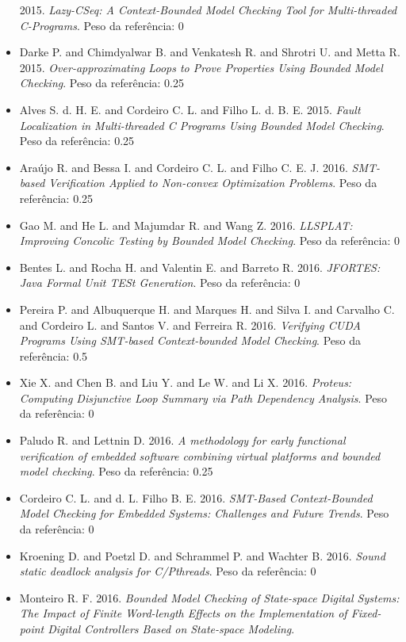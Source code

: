 \begin{itemize}
      2015.
      {\it Lazy-CSeq: A Context-Bounded Model Checking Tool for Multi-threaded C-Programs}.
      Peso da referência: 0
\item Darke P. and Chimdyalwar B. and Venkatesh R. and Shrotri U. and Metta R.
      2015.
      {\it Over-approximating Loops to Prove Properties Using Bounded Model Checking}.
      Peso da referência: 0.25
\item Alves S. d. H. E. and Cordeiro C. L. and Filho L. d. B. E.
      2015.
      {\it Fault Localization in Multi-threaded C Programs Using Bounded Model Checking}.
      Peso da referência: 0.25
\item Araújo R. and Bessa I. and Cordeiro C. L. and Filho C. E. J.
      2016.
      {\it SMT-based Verification Applied to Non-convex Optimization Problems}.
      Peso da referência: 0.25
\item Gao M. and He L. and Majumdar R. and Wang Z.
      2016.
      {\it LLSPLAT: Improving Concolic Testing by Bounded Model Checking}.
      Peso da referência: 0
\item Bentes L. and Rocha H. and Valentin E. and Barreto R.
      2016.
      {\it JFORTES: Java Formal Unit TESt Generation}.
      Peso da referência: 0
\item Pereira P. and Albuquerque H. and Marques H. and Silva I. and Carvalho C. and Cordeiro L. and Santos V. and Ferreira R.
      2016.
      {\it Verifying CUDA Programs Using SMT-based Context-bounded Model Checking}.
      Peso da referência: 0.5
\item Xie X. and Chen B. and Liu Y. and Le W. and Li X.
      2016.
      {\it Proteus: Computing Disjunctive Loop Summary via Path Dependency Analysis}.
      Peso da referência: 0
\item Paludo R. and Lettnin D.
      2016.
      {\it A methodology for early functional verification of embedded software combining virtual platforms and bounded model checking}.
      Peso da referência: 0.25
\item Cordeiro C. L. and d. L. Filho B. E.
      2016.
      {\it SMT-Based Context-Bounded Model Checking for Embedded Systems: Challenges and Future Trends}.
      Peso da referência: 0
\item Kroening D. and Poetzl D. and Schrammel P. and Wachter B.
      2016.
      {\it Sound static deadlock analysis for C/Pthreads}.
      Peso da referência: 0
\item Monteiro R. F.
      2016.
      {\it Bounded Model Checking of State-space Digital Systems: The Impact of Finite Word-length Effects on the Implementation of Fixed-point Digital Controllers Based on State-space Modeling}.

\end{itemize}

